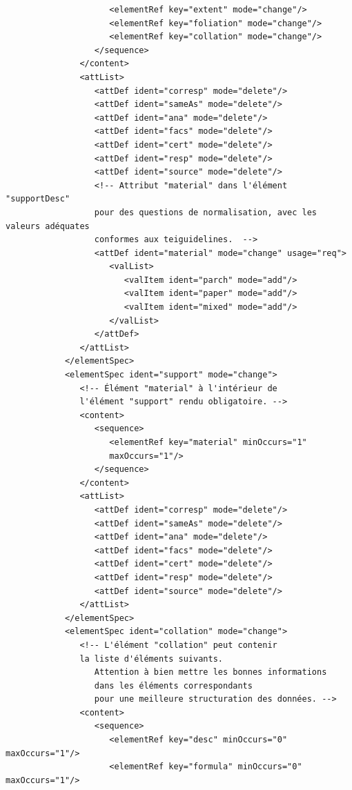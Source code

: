 \documentclass[a4paper,12pt,twoside]{book}
\begin{document}
\begin{verbatim}
                     <elementRef key="extent" mode="change"/>
                     <elementRef key="foliation" mode="change"/>
                     <elementRef key="collation" mode="change"/>
                  </sequence>
               </content>
               <attList>
                  <attDef ident="corresp" mode="delete"/>
                  <attDef ident="sameAs" mode="delete"/>
                  <attDef ident="ana" mode="delete"/>
                  <attDef ident="facs" mode="delete"/>
                  <attDef ident="cert" mode="delete"/>
                  <attDef ident="resp" mode="delete"/>
                  <attDef ident="source" mode="delete"/>
                  <!-- Attribut "material" dans l'élément "supportDesc" 
                  pour des questions de normalisation, avec les valeurs adéquates 
                  conformes aux teiguidelines.  -->
                  <attDef ident="material" mode="change" usage="req">
                     <valList>
                        <valItem ident="parch" mode="add"/>
                        <valItem ident="paper" mode="add"/>
                        <valItem ident="mixed" mode="add"/>
                     </valList>
                  </attDef>
               </attList>
            </elementSpec>
            <elementSpec ident="support" mode="change">
               <!-- Élément "material" à l'intérieur de 
               l'élément "support" rendu obligatoire. -->
               <content>
                  <sequence>
                     <elementRef key="material" minOccurs="1" 
                     maxOccurs="1"/>
                  </sequence>
               </content>
               <attList>
                  <attDef ident="corresp" mode="delete"/>
                  <attDef ident="sameAs" mode="delete"/>
                  <attDef ident="ana" mode="delete"/>
                  <attDef ident="facs" mode="delete"/>
                  <attDef ident="cert" mode="delete"/>
                  <attDef ident="resp" mode="delete"/>
                  <attDef ident="source" mode="delete"/>
               </attList>
            </elementSpec>
            <elementSpec ident="collation" mode="change">
               <!-- L'élément "collation" peut contenir 
               la liste d'éléments suivants. 
                  Attention à bien mettre les bonnes informations 
                  dans les éléments correspondants 
                  pour une meilleure structuration des données. -->
               <content>
                  <sequence>
                     <elementRef key="desc" minOccurs="0" maxOccurs="1"/>
                     <elementRef key="formula" minOccurs="0" maxOccurs="1"/>

\end{verbatim}
\end{document}

